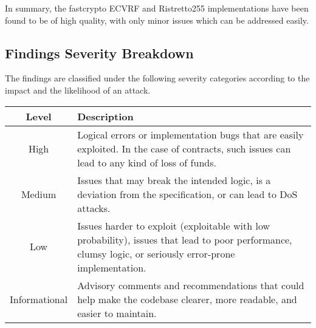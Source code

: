 In summary, the fastcrypto ECVRF and Ristretto255 implementations have been found to be of high quality, with only minor issues which can be addressed easily.

\subsection{Findings Severity Breakdown}
The findings are classified under the following severity categories according to the impact and the likelihood of an attack.
\begin{center}
\begin{tabular}{|| c | p{9cm}||} 
 \hline
\textbf{Level} & \textbf{Description} \\ [0.5ex] 
 \hline\hline
 High & Logical errors or implementation bugs that are easily exploited. In the case of contracts, such issues can lead to any kind of loss of funds.\\
 \hline
 Medium & Issues that may break the intended logic, is a deviation from the specification, or can lead to DoS attacks.\\
 \hline
 Low & Issues harder to exploit (exploitable with low probability), issues that lead to poor performance, clumsy logic, or seriously error-prone implementation.\\
 \hline
 Informational & Advisory comments and recommendations that could help make the codebase clearer, more readable, and easier to maintain.\\
 \hline
\end{tabular}
\end{center}
